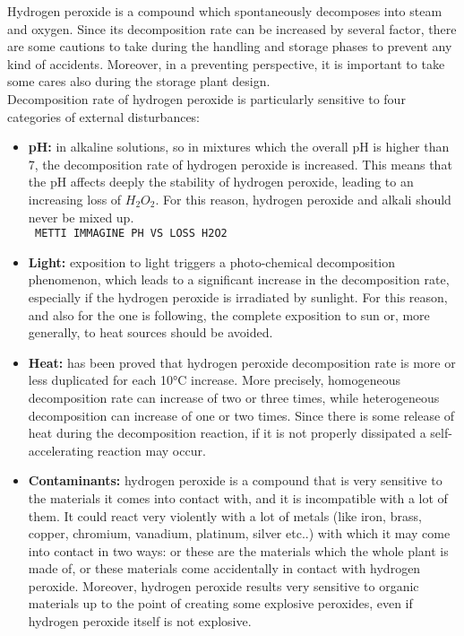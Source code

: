 \documentclass[a4paper]{report}
\begin{document}
Hydrogen peroxide is a compound which spontaneously decomposes into steam and oxygen. Since its decomposition rate can be increased by several factor, there are some cautions to take during the handling and storage phases to prevent any kind of accidents. Moreover, in a preventing perspective, it is important to take some cares also during the storage plant design. \\
Decomposition rate of hydrogen peroxide is particularly sensitive to four categories of external disturbances: 
\begin{itemize}
\item \textbf{pH:} in alkaline solutions, so in mixtures which the overall pH is higher than 7, the decomposition rate of hydrogen peroxide is increased. This means that the pH affects deeply the stability of hydrogen peroxide, leading to an increasing loss of $H_2O_2$. For this reason, hydrogen peroxide and alkali should never be mixed up.\\
\texttt{\color{red} METTI IMMAGINE PH VS LOSS H2O2}\\
\item \textbf{Light:} exposition to light triggers a photo-chemical decomposition phenomenon, which leads to a significant increase in the decomposition rate, especially if the hydrogen peroxide is irradiated by sunlight. For this reason, and also for the one is following, the complete exposition to sun or, more generally, to heat sources should be avoided.
\item \textbf{Heat:} has been proved that hydrogen peroxide decomposition rate is more or less duplicated for each 10°C increase. More precisely, homogeneous decomposition rate can increase of two or three times, while heterogeneous decomposition can increase of one or two times. Since there is some release of heat during the decomposition reaction, if it is not properly dissipated a self-accelerating reaction may occur.
\item \textbf{Contaminants:} hydrogen peroxide is a compound that is very sensitive to the materials it comes into contact with, and it is incompatible with a lot of them. It could react very violently with a lot of metals (like iron, brass, copper, chromium, vanadium, platinum, silver etc..) with which it may come into contact in two ways: or these are the materials which the whole plant is made of, or these materials come accidentally in contact with hydrogen peroxide. Moreover, hydrogen peroxide results very sensitive to organic materials up to the point of creating some explosive peroxides, even if hydrogen peroxide itself is not explosive. 
\end{itemize}
\end{document}
